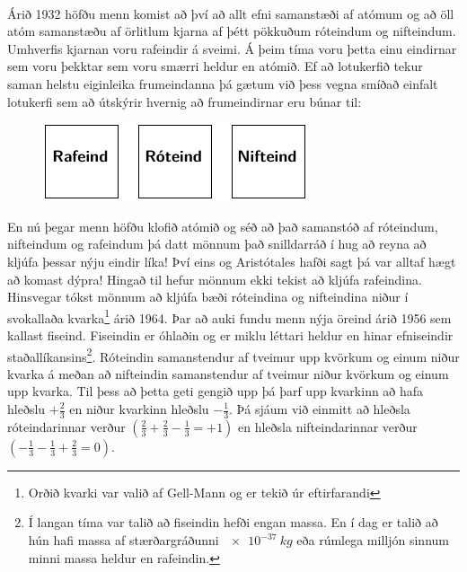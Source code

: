 \ifdefined \wholebook \else\documentclass[oneside]{book}\usepackage{EdlBook}\graphicspath{{figures/}}
\begin{document}
\begin{tcolorbox}

 \\

\vspace{-0.3cm}
\end{tcolorbox}

Árið 1932 höfðu menn komist að því að allt efni samanstæði af atómum og að öll atóm samanstæðu af örlitlum kjarna af þétt pökkuðum róteindum og nifteindum. Umhverfis kjarnan voru rafeindir á sveimi. Á þeim tíma voru þetta einu eindirnar sem voru þekktar sem voru smærri heldur en atómið. Ef að lotukerfið tekur saman helstu eiginleika frumeindanna þá gætum við þess vegna smíðað einfalt lotukerfi sem að útskýrir hvernig að frumeindirnar eru búnar til:

\begin{figure}[H]
    \centering
    \includegraphics[width=.5\textwidth]{figures/lotukerfi3.pdf}
\end{figure}


En nú þegar menn höfðu klofið atómið og séð að það samanstóð af róteindum, nifteindum og rafeindum þá datt mönnum það snilldarráð í hug að reyna að kljúfa þessar nýju eindir líka! Því eins og Aristótales hafði sagt þá var alltaf hægt að komast dýpra! Hingað til hefur mönnum ekki tekist að kljúfa rafeindina. Hinsvegar tókst mönnum að kljúfa bæði róteindina og nifteindina niður í svokallaða kvarka\footnote{Orðið kvarki var valið af Gell-Mann og er tekið úr eftirfarandi } árið 1964. Þar að auki fundu menn nýja öreind árið 1956 sem kallast fiseind. Fiseindin er óhlaðin og er miklu léttari heldur en hinar efniseindir staðallíkansins\footnote{Í langan tíma var talið að fiseindin hefði engan massa. En í dag er talið að hún hafi massa af stærðargráðunni $\SI{e-37}{kg}$ eða rúmlega milljón sinnum minni massa heldur en rafeindin.}. Róteindin samanstendur af tveimur upp kvörkum og einum niður kvarka á meðan að nifteindin samanstendur af tveimur niður kvörkum og einum upp kvarka. Til þess að þetta geti gengið upp þá þarf upp kvarkinn að hafa hleðslu $+\frac{2}{3}$ en niður kvarkinn hleðslu $-\frac{1}{3}$. Þá sjáum við einmitt að hleðsla róteindarinnar verður $(\frac{2}{3} + \frac{2}{3} - \frac{1}{3} = +1)$ en hleðsla nifteindarinnar verður $(-\frac{1}{3} - \frac{1}{3} + \frac{2}{3} = 0)$.
\end{document}
